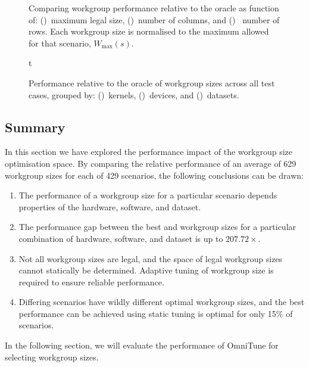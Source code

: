 \begin{figure}

\caption[Workgroup size performances vs.\ size]{%
  Comparing workgroup performance relative to the oracle as function
  of: ()~maximum legal size,
  ()~number of columns, and
  ()~ number of rows. Each workgroup
  size is normalised to the maximum allowed for that scenario, $W_{\max}(s)$.%
}
\label{fig:performance-wgsizes}
\end{figure}
\newpage
\begin{figure}t

\caption[Workgroup size performances across device, kernel, and dataset]{%
  Performance relative to the oracle of workgroup sizes across all
  test cases, grouped by: ()~kernels,
  ()~devices, and
  ()~datasets.%
}
\label{fig:performances}
\end{figure}


\subsection{Summary}

In this section we have explored the performance impact of the
workgroup size optimisation space. By comparing the relative
performance of an average of 629 workgroup sizes for each of 429
scenarios, the following conclusions can be drawn:

\begin{enumerate}
\item The performance of a workgroup size for a particular scenario
  depends properties of the hardware, software, and dataset.
\item The performance gap between the best and workgroup sizes for a
  particular combination of hardware, software, and dataset is up to
  $207.72\times$.
\item Not all workgroup sizes are legal, and the space of legal
  workgroup sizes cannot statically be determined. Adaptive tuning of
  workgroup size is required to ensure reliable performance.
\item Differing scenarios have wildly different optimal workgroup
  sizes, and the best performance can be achieved using static tuning
  is optimal for only 15\% of scenarios.
\end{enumerate}
%
%
In the following section, we will evaluate the performance of OmniTune
for selecting workgroup sizes.


